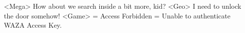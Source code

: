 <Mega> How about we search inside a bit more, kid? 
<Geo> I need to unlock the door somehow! 
<Game> = Access Forbidden = Unable to authenticate WAZA Access Key. 
